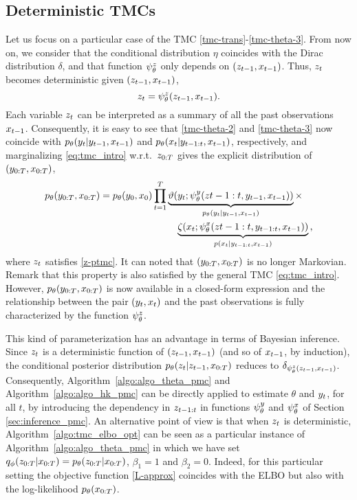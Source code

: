 \tocless\subsection{Deterministic TMCs}
\label{sec:def-ppmc}
Let us focus on a particular case 
of the TMC \eqref{tmc-trans}-\eqref{tmc-theta-3}. 
From now on, 
we consider that the conditional distribution $\eta$
coincides with the Dirac distribution $\delta$, 
and that function $\psi^{z}_{\theta}$ only depends on $(z_{t-1},x_{t-1})$.
Thus, $z_t$ becomes deterministic given $(z_{t-1},x_{t-1})$,
\begin{equation}
\label{z-ptmc}
z_t=\psi^{z}_{\theta}(z_{t-1},x_{t-1}) \text{.}
\end{equation}
Each variable $z_t$ can be interpreted
as a summary of all the past observations $x_{t-1}$. Consequently, it is easy to see
that 
\eqref{tmc-theta-2} and \eqref{tmc-theta-3} now coincide with 
$p_{\theta}(y_t|y_{t-1},x_{t-1})$ and $p_{\theta}(x_t|y_{t-1:t},x_{t-1})$, 
respectively, and marginalizing \eqref{eq:tmc_intro} w.r.t.~$z_{0:T}$
gives the explicit distribution of
$(y_{0:T},x_{0:T})$,
\begin{align}
 \label{eq:ppmc_general}
    p_{\theta}(y_{0:T},x_{0:T})=p_{\theta}(y_0,x_0)
    \prod_{t=1}^T   & \underbrace{\vartheta(y_t;\psi^{y}_{\theta}(z{t-1:t},y_{t-1},x_{t-1}))}_{p_{\theta}(y_t|y_{t-1},x_{t-1})} \times \nonumber \\
    & \quad \underbrace{\zeta(x_t;\psi^{x}_{\theta}(z{t-1:t},y_{t-1:t},x_{t-1}))}
_{p(x_t|y_{t-1:t},x_{t-1})} \text{,}
\end{align}
where $z_t$ satisfies \eqref{z-ptmc}.
It can noted that $(y_{0:T},x_{0:T})$ is no longer
Markovian. Remark that this property
is also satisfied by the general TMC \eqref{eq:tmc_intro}. However,
$p_{\theta}(y_{0:T},x_{0:T})$ is now available in a closed-form 
expression and the relationship between the 
pair $(y_t,x_t)$ and the past observations is
fully characterized by the function $\psi^{z}_{\theta}$.


This kind of parameterization has an advantage in 
terms of Bayesian inference. Since $z_t$ is
a deterministic function of $(z_{t-1},x_{t-1})$ (and so of $x_{t-1}$, by induction),
the conditional
posterior distribution $p_{\theta}(z_t|z_{t-1},x_{0:T})$ reduces 
to $\delta_{\psi^{z}_{\theta}(z_{t-1},x_{t-1})}$.
Consequently, Algorithm~\ref{algo:algo_theta_pmc} and
Algorithm~\ref{algo:algo_hk_pmc} can be directly applied to estimate $\theta$ and $y_t$, for all $t$, by introducing the dependency in $z_{t-1:t}$ in functions $\psi^{y}_{\theta}$
and $\psi^{x}_{\theta}$ of Section \ref{sec:inference_pmc}.
An alternative point of view is that
when $z_t$ is deterministic,
Algorithm~\ref{algo:tmc_elbo_opt} can be seen as a particular instance of Algorithm~\ref{algo:algo_theta_pmc} 
in which we have set $q_\phi(z_{0:T}|x_{0:T})=p_{\theta}(z_{0:T}|x_{0:T})$,
$\beta_1=1$ and $\beta_2=0$. Indeed, for this particular setting the objective function
\eqref{L-approx} coincides with the ELBO but also with the log-likelihood $p_{\theta}(x_{0:T})$. 


